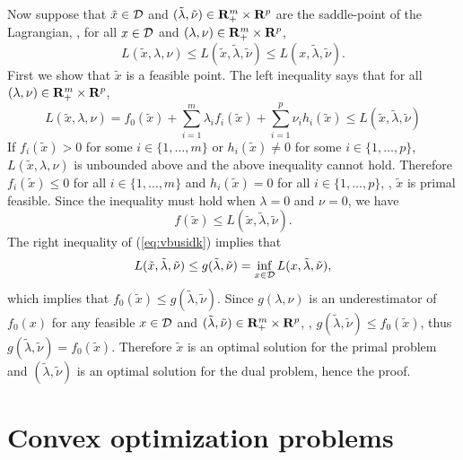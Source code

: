 Now suppose that $\tilde{x}\in\mathcal{D}$ and $(\tilde{\lambda}, \tilde{\nu}) \in \mathbf{R}^m_+ \times \mathbf{R}^p$
are the saddle-point of the Lagrangian, \ie,
for all $x\in\mathcal{D}$ and $(\lambda, \nu) \in \mathbf{R}^m_+ \times \mathbf{R}^p$,
\begin{equation}
\label{eq:vbusidk}
L(\tilde{x}, \lambda, \nu)
\leq L(\tilde{x}, \tilde{\lambda}, \tilde{\nu})
\leq L(x, \tilde{\lambda}, \tilde{\nu}).
\end{equation}
First we show that $\tilde{x}$ is a feasible point.
The left inequality says that for all $(\lambda, \nu) \in \mathbf{R}^m_+ \times \mathbf{R}^p$,
\begin{equation}
L(\tilde{x}, \lambda, \nu)=
f_0(\tilde{x}) + \sum_{i=1}^m \lambda_i f_i(\tilde{x}) + \sum_{i=1}^p \nu_i h_i(\tilde{x})
\leq L(\tilde{x}, \tilde{\lambda}, \tilde{\nu})
\end{equation}
If $f_i(\tilde{x})>0$ for some $i\in\{1,\ldots,m\}$ or
$h_i(\tilde{x})\neq 0$ for some $i\in\{1,\ldots,p\}$,
$L(\tilde{x}, \lambda, \nu)$ is unbounded above and the above inequality cannot hold.
Therefore $f_i(\tilde{x})\leq0$ for all $i\in\{1,\ldots,m\}$ and $h_i(\tilde{x})= 0$ for all $i\in\{1,\ldots,p\}$,
\ie, $\tilde{x}$ is primal feasible.
Since the inequality must hold when $\lambda = 0$ and $\nu =0$,
we have
\begin{equation}
\label{eq:cidkshx}
f(\tilde{x}) \leq L(\tilde{x}, \tilde{\lambda}, \tilde{\nu}).
\end{equation}
The right inequality
of (\ref{eq:vbusidk})
implies that
\begin{equation}
\label{eq:vydsuxk}
L(\tilde{x}, \tilde{\lambda}, \tilde{\nu})
\leq g(\tilde{\lambda}, \tilde{\nu}) = \inf_{x\in\mathcal{D}} L({x}, \tilde{\lambda}, \tilde{\nu}),
\end{equation}
which implies that $f_0(\tilde{x}) \leq g(\tilde{\lambda}, \tilde{\nu})$.
Since $g(\lambda, \nu)$ is an underestimator of $f_0(x)$ for any feasible $x\in\mathcal{D}$ and $(\tilde{\lambda}, \tilde{\nu}) \in \mathbf{R}^m_+ \times \mathbf{R}^p$,
\ie, $g(\tilde{\lambda}, \tilde{\nu}) \leq f_0(\tilde{x})$, thus
$g(\tilde{\lambda}, \tilde{\nu}) = f_0(\tilde{x})$.
Therefore $\tilde{x}$ is an optimal solution for the primal problem
and $(\tilde{\lambda}, \tilde{\nu})$  is an optimal solution for the dual problem,
hence the proof.


\section{Convex optimization problems}

